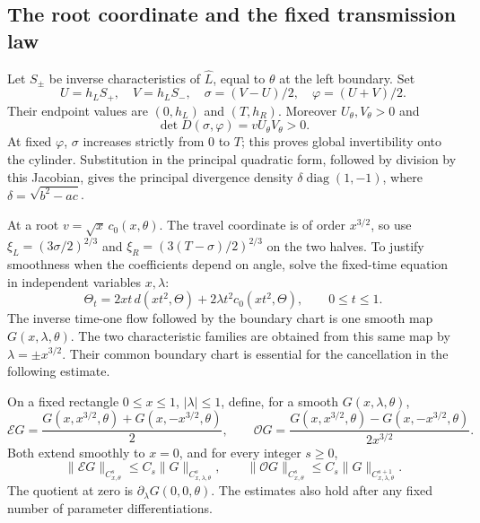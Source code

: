 \subsection{The root coordinate and the fixed transmission law}

Let $S_\pm$ be inverse characteristics of $\widehat L$, equal to
$\theta$ at the left boundary. Set
\begin{equation}\label{eq:fixed-strip-coordinates}
 U=h_LS_+,\quad V=h_LS_-,\quad
 \sigma=(V-U)/2,\quad\varphi=(U+V)/2.
\end{equation}
Their endpoint values are $(0,h_L)$ and $(T,h_R)$. Moreover
$U_\theta,V_\theta>0$ and
\[
 \det D(\sigma,\varphi)=vU_\theta V_\theta>0.
\]
At fixed $\varphi$, $\sigma$ increases strictly from $0$ to $T$;
this proves global invertibility onto the cylinder. Substitution in
the principal quadratic form, followed by division by this Jacobian,
gives the principal divergence density
$\delta\operatorname{diag}(1,-1)$, where $\delta=\sqrt{b^2-ac}$.

At a root $v=\sqrt x\,c_0(x,\theta)$. The travel coordinate is
of order $x^{3/2}$, so use
$\xi_L=(3\sigma/2)^{2/3}$ and
$\xi_R=(3(T-\sigma)/2)^{2/3}$ on the two halves. To justify
smoothness when the coefficients depend on angle, solve the fixed-time
equation in independent variables $x,\lambda$:
\begin{equation}\label{eq:fixed-strip-root-flow}
 \Theta_t=2xt\,d(xt^2,\Theta)+2\lambda t^2c_0(xt^2,\Theta),
 \qquad 0\le t\le1.
\end{equation}
The inverse time-one flow followed by the boundary chart is one smooth
map $G(x,\lambda,\theta)$. The two characteristic families are obtained
from this same map by $\lambda=\pm x^{3/2}$. Their common boundary
chart is essential for the cancellation in the following estimate.

\begin{lemma}
\label{lem:rewrite-root-composition}
On a fixed rectangle $0\le x\le1$, $|\lambda|\le1$, define, for a
smooth $G(x,\lambda,\theta)$,
\[
 \mathcal E G=\frac{G(x,x^{3/2},\theta)+G(x,-x^{3/2},\theta)}2,\qquad
 \mathcal O G=\frac{G(x,x^{3/2},\theta)-G(x,-x^{3/2},\theta)}
                         {2x^{3/2}}.
\]
Both extend smoothly to $x=0$, and for every integer $s\ge0$,
\begin{equation}\label{eq:rewrite-root-composition-bound}
 \|\mathcal E G\|_{C^s_{x,\theta}}\le C_s\|G\|_{C^s_{x,\lambda,\theta}},
 \qquad
 \|\mathcal O G\|_{C^s_{x,\theta}}
                       \le C_s\|G\|_{C^{s+1}_{x,\lambda,\theta}}.
\end{equation}
The quotient at zero is $\partial_\lambda G(0,0,\theta)$.
The estimates also hold after any fixed number of parameter
differentiations.
\end{lemma}

